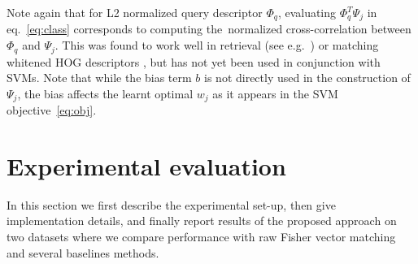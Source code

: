 \documentclass[10pt,twocolumn,letterpaper]{article}
\begin{document}
      Note again that for L2 normalized query descriptor $\Phi_q$, evaluating $\Phi_q^T\Psi_j$ in eq.~\eqref{eq:class} corresponds to computing the~normalized cross-correlation between $\Phi_q$ and $\Psi_j$. This was found to work well in retrieval (see e.g.~\cite{Sivic03}) or matching whitened HOG descriptors \cite{Gharbi12, Hariharan12}, but has not yet been used in conjunction with SVMs.    
      Note that while the bias term $b$ is not directly used in the construction of $\Psi_j$, the bias affects the learnt optimal $w_j$ as it appears in the SVM objective~\eqref{eq:obj}. 

\section{Experimental evaluation}
   \label{sec:exp}
   In this section we first describe the experimental set-up, then give implementation details, and finally report results of the proposed approach on two datasets where we compare performance with raw Fisher vector matching and several baselines methods. 
\end{document}
